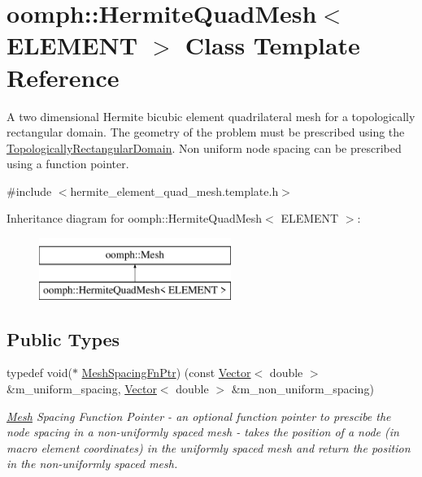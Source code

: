 \hypertarget{classoomph_1_1HermiteQuadMesh}{}\section{oomph\+:\+:Hermite\+Quad\+Mesh$<$ E\+L\+E\+M\+E\+NT $>$ Class Template Reference}
\label{classoomph_1_1HermiteQuadMesh}


A two dimensional Hermite bicubic element quadrilateral mesh for a topologically rectangular domain. The geometry of the problem must be prescribed using the \hyperlink{classoomph_1_1TopologicallyRectangularDomain}{Topologically\+Rectangular\+Domain}. Non uniform node spacing can be prescribed using a function pointer.  




{\ttfamily \#include $<$hermite\+\_\+element\+\_\+quad\+\_\+mesh.\+template.\+h$>$}

Inheritance diagram for oomph\+:\+:Hermite\+Quad\+Mesh$<$ E\+L\+E\+M\+E\+NT $>$\+:\begin{figure}[H]
\begin{center}
\leavevmode
\includegraphics[height=2.000000cm]{classoomph_1_1HermiteQuadMesh}
\end{center}
\end{figure}
\subsection*{Public Types}
\begin{DoxyCompactItemize}
\item 
typedef void($\ast$ \hyperlink{classoomph_1_1HermiteQuadMesh_abebf4806b300591f976398404ed0ef3f}{Mesh\+Spacing\+Fn\+Ptr}) (const \hyperlink{classoomph_1_1Vector}{Vector}$<$ double $>$ \&m\+\_\+uniform\+\_\+spacing, \hyperlink{classoomph_1_1Vector}{Vector}$<$ double $>$ \&m\+\_\+non\+\_\+uniform\+\_\+spacing)
\begin{DoxyCompactList}\small\item\em \hyperlink{classoomph_1_1Mesh}{Mesh} Spacing Function Pointer -\/ an optional function pointer to prescibe the node spacing in a non-\/uniformly spaced mesh -\/ takes the position of a node (in macro element coordinates) in the uniformly spaced mesh and return the position in the non-\/uniformly spaced mesh. \end{DoxyCompactList}\end{DoxyCompactItemize}
